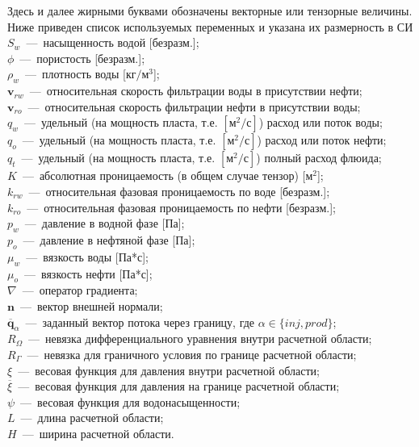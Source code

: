 Здесь и далее жирными буквами обозначены векторные или тензорные величины. Ниже приведен список
используемых переменных и указана их размерность в СИ\\
$S_w$~---~насыщенность водой [безразм.];\\
$\phi$~---~пористость [безразм.];\\
$\rho_w$~---~плотность воды [$\text{кг}/\text{м}^3$];\\
$\bm{v}_{rw}$~---~относительная скорость фильтрации воды в присутствии нефти;\\
$\bm{v}_{ro}$~---~относительная скорость фильтрации нефти в присутствии воды;\\
$q_w$~---~удельный (на мощность пласта, т.е. $[\text{м}^2/\text{с}]$) расход или поток воды;\\
$q_o$~---~удельный (на мощность пласта, т.е. $[\text{м}^2/\text{с}]$) расход или поток нефти;\\ 
$q_t$~---~удельный (на мощность пласта, т.е. $[\text{м}^2/\text{с}]$) полный расход флюида;\\ 
$K$~---~абсолютная проницаемость (в общем случае тензор) [$\text{м}^2$];\\
$k_{rw}$~---~относительная фазовая проницаемость по воде [безразм.];\\
$k_{ro}$~---~относительная фазовая проницаемость по нефти [безразм.];\\
$p_w$~---~давление в водной фазе [Па];\\
$p_o$~---~давление в нефтяной фазе [Па];\\
$\mu_w$~---~вязкость воды [Па*с];\\
$\mu_o$~---~вязкость нефти [Па*с];\\
$\nabla$~---~оператор градиента;\\
$\bm{n}$~---~вектор внешней нормали;\\
$\overline{\bm{q}}_\alpha$~---~заданный вектор потока через границу, где $\alpha \in \{inj,prod\}$;\\
$R_\Omega$~---~невязка дифференциального уравнения внутри расчетной области;\\
$R_\Gamma$~---~невязка для граничного условия по границе расчетной области;\\
$\xi$~---~весовая функция для давления внутри расчетной области;\\
$\overline{\xi}$~---~весовая функция для давления на границе расчетной области;\\
$\psi$~---~весовая функция для водонасыщенности;\\
$L$~---~длина расчетной области;\\
$H$~---~ширина расчетной области.

